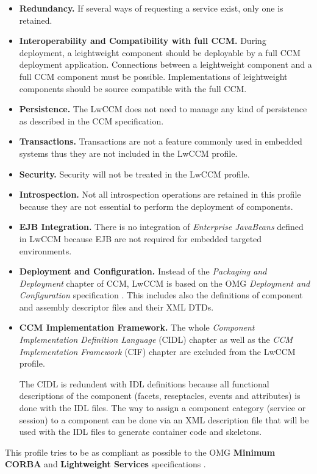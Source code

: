 \begin{itemize}
\item {\bf Redundancy.}
If several ways of requesting a service exist, only one is retained.

\item {\bf Interoperability and Compatibility with full CCM.}
During deployment, a leightweight component should be deployable by a full
CCM deployment application. Connections between a leightweight component
and a full CCM component must be possible.
Implementations of leightweight components should be source compatible
with the full CCM.

\item {\bf Persistence.}
The LwCCM does not need to manage any kind of persistence as described in the
CCM specification. 

\item {\bf Transactions.}
Transactions are not a feature commonly used in embedded systems thus they
are not included in the LwCCM profile.

\item {\bf Security.}
Security will not be treated in the LwCCM profile.

\item {\bf Introspection.}
Not all introspection operations are retained in this profile because they
are not essential to perform the deployment of components.

\item {\bf EJB Integration.}
There is no integration of {\it Enterprise JavaBeans} defined in LwCCM
because EJB are not required for embedded targeted environments.

\item {\bf Deployment and Configuration.}
Instead of the {\it Packaging and Deployment} chapter of CCM, LwCCM
is based on the OMG {\it Deployment and Configuration} specification 
\cite{DeploymentAndConfiguration}.
This includes also the definitions of component and assembly descriptor
files and their XML DTDs.

\item {\bf CCM Implementation Framework.}
The whole {\it Component Implementation Definition Language} (CIDL) chapter 
as well as the {\it CCM Implementation Framework} (CIF) chapter are excluded 
from the LwCCM profile.

The CIDL is redundent with IDL definitions because all functional descriptions
of the component (facets, reseptacles, events and attributes) is done with the 
IDL files.
The way to assign a component category (service or session) to a component
can be done via an XML description file that will be used with the IDL files to
generate container code and skeletons.
\end{itemize}

\noindent
This profile tries to be as compliant as possible to the OMG 
{\bf Minimum CORBA} and {\bf Lightweight Services} specifications 
\cite{Minimum_CORBA, LightweightServices}.


